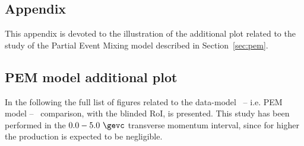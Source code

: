 %
\begin{appendices}

\chapter{Appendix}

This appendix is devoted to the illustration of the additional plot related to the study of the Partial
Event Mixing model described in Section~\ref{sec:pem}.

%
\section{PEM model additional plot} \label{app:pem}

In the following the full list of figures related to the data-model \ -- i.e. PEM model -- \ comparison, with 
the blinded RoI, is presented.
This study has been performed in the $0.0 - 5.0\ \gevc$ transverse momentum interval,
since for higher \pt the \ds production is expected to be negligible.


\end{appendices}
